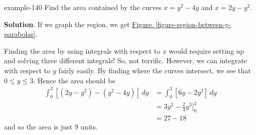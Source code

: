 \documentclass[10pt,]{book}
\numberwithin{equation}{section}
\newcommand{\amp}{&}
\begin{document}
\begin{example}{}{example-140}%
\hypertarget{p-624}{}%
Find the area contained by the curves \(x = y^{2} - 4y\) and \(x = 2y - y^{2}\).%
\par\smallskip%
\noindent\textbf{Solution}.\hypertarget{solution-136}{}\quad%
\hypertarget{p-625}{}%
If we graph the region, we get \hyperref[figure-region-between-y-parabolas]{Figure~\ref{figure-region-between-y-parabolas}}.%
\begin{figure}
\centering
{
}
\end{figure}
\hypertarget{p-626}{}%
Finding the area by using integrals with respect to \(x\) would require setting up and solving three different integrals! So, not terrific. However, we can integrate with respect to \(y\) fairly easily. By finding where the curves intersect, we see that \(0\leq y\leq 3\). Hence the area should be%
\begin{align*}
\int_{0}^{3}[(2y - y^{2}) - (y^{2} - 4y)]\,dy \amp = \int_{0}^{3}[6y - 2y^{2}]\,dy \\
\amp = 3y^{2} - \frac{2}{3}y^{3}\Bigg]_{0}^{3} \\
\amp = 27 - 18 
\end{align*}
and so the area is just \(9\) units.%
\end{example}
%
%
\typeout{************************************************}
\typeout{************************************************}
%
\end{document}
